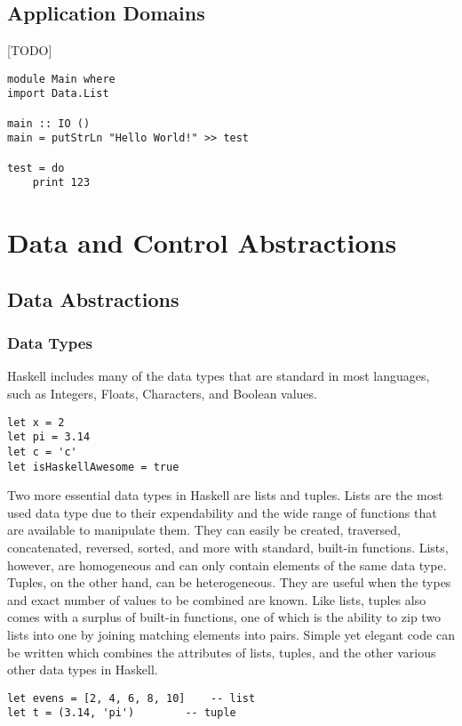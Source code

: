 \documentclass[titlepage,12pt]{article}
\begin{document}
\subsection{Application Domains}


[TODO]~\cite{learnyouahaskell}
\begin{verbatim}
module Main where
import Data.List

main :: IO ()
main = putStrLn "Hello World!" >> test

test = do 
    print 123
\end{verbatim}

\section{Data and Control Abstractions}


\subsection{Data Abstractions}
\subsubsection{Data Types}

Haskell includes many of the data types that are standard in most languages, such as Integers, Floats, Characters, and Boolean values. 

 

\begin{verbatim}
let x = 2
let pi = 3.14
let c = 'c'
let isHaskellAwesome = true
\end{verbatim}

Two more essential data types in Haskell are lists and tuples. Lists are the most used data type due to their expendability and the wide range of functions that are available to manipulate them. They can easily be created, traversed, concatenated, reversed, sorted, and more with standard, built-in functions. Lists, however, are homogeneous and can only contain elements of the same data type. Tuples, on the other hand, can be heterogeneous. They are useful when the types and exact number of values to be combined are known. Like lists, tuples also comes with a surplus of built-in functions, one of which is the ability to zip two lists into one by joining matching elements into pairs. Simple yet elegant code can be written which combines the attributes of lists, tuples, and the other various other data types in Haskell.

\begin{verbatim}
let evens = [2, 4, 6, 8, 10]	-- list
let t = (3.14, 'pi')		-- tuple
\end{verbatim}
\end{document}

